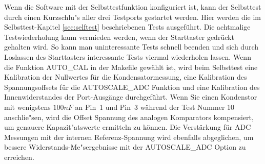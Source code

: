 Wenn die Software mit der Selbsttestfunktion konfiguriert ist, kann der Selbsttest durch einen Kurzschlu"s aller drei
Testports gestartet werden.
Hier werden die im Selbsttest-Kapitel \ref{sec:selftest} beschriebenen Tests ausgef\"uhrt. Die achtmalige Testwiederholung
kann vermieden werden, wenn der Starttaster gedr\"uckt gehalten wird. So kann man uninteressante Tests schnell beenden und
sich durch Loslassen des Starttasters interessante Tests viermal wiederholen lassen.
Wenn die Funktion AUTO\_CAL in der Makefile gew\"ahlt ist, wird beim Selbsttest eine Kalibration der Nullwertes f\"ur die
Kondensatormessung, eine Kalibration des Spannungsoffsets f\"ur die AUTOSCALE\_ADC Funktion  und 
eine Kalibration des Innenwiderstandes der Port-Ausg\"ange durchgef\"uhrt.
Wenn Sie einen Kondenstor mit wenigstens \(100 nF\) an Pin~1 und Pin~3 w\"ahrend der Test Nummer 10 anschlie"sen,
wird die Offset Spannung des analogen Komparators kompensiert, um genauere Kapazit"atswerte ermitteln zu k\"onnen.
Die Verst\"arkung f\"ur ADC Messungen mit der internen Referenz-Spannung wird ebenfalls abgeglichen, um
bessere Widerstands-Me"sergebnisse mit der AUTOSCALE\_ADC Option zu erreichen.
